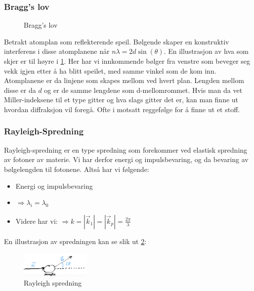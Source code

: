 \documentclass{article}
\begin{document}
\subsubsection{Bragg's lov}
\begin{figure}
    \centering
    \caption{Bragg's lov}
    \label{fig:braggs_lov}
\end{figure}
Betrakt atomplan som reflekterende speil. Bølgende skaper en konstruktiv interferens i disse atomplanene når $n \lambda = 2d \sin(\theta)$. En illustrasjon av hva som skjer er til høyre i \ref{fig:braggs_lov}. Her har vi innkommende bølger fra venstre som beveger seg vekk igjen etter å ha blitt speilet, med samme vinkel som de kom inn. Atomplanene er da linjene som skapes mellom ved hvert plan. Lengden mellom disse er da $d$ og er de samme lengdene som d-mellomrommet. Hvis man da vet Miller-indeksene til et type gitter og hva slags gitter det er, kan man finne ut hvordan diffraksjon vil foregå. Ofte i motsatt reggefølge for å finne ut et stoff.
\subsubsection{Rayleigh-Spredning}
Rayleigh-spredning er en type spredning som forekommer ved elastisk spredning av fotoner av materie. Vi har derfor energi og impulsbevaring, og da bevaring av bølgelengden til fotonene. Altså har vi følgende:
\begin{itemize}
    \item Energi og impulsbevaring
    \item $\Rightarrow \lambda_i = \lambda_0$
    \item Videre har vi: $\Rightarrow k = |\vec{k}_1|= |\vec{k}_p| = \frac{2 \pi}{\lambda}$
\end{itemize}
En illustrasjon av spredningen kan se slik ut \ref{fig:rayleigh_spredning}:
\begin{figure}[H]
    \centering
    \includegraphics[width=0.3\textwidth]{bilder/rayleigh_spredning.png}
    \caption{Rayleigh spredning}
    \label{fig:rayleigh_spredning}
\end{figure}
\end{document}
